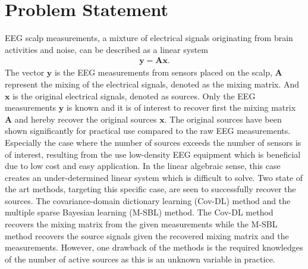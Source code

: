 \chapter{Problem Statement}\label{ch:problemstatement}
EEG scalp measurements, a mixture of electrical signals originating from brain activities and noise, can be described as a linear system
\begin{align*}
\mathbf{y} = \mathbf{Ax}.
\end{align*}
The vector $\mathbf{y}$ is the EEG measurements from sensors placed on the scalp, $\mathbf{A}$ represent the mixing of the electrical signals, denoted as the mixing matrix. And $\mathbf{x}$ is the original electrical signals, denoted as sources. 
Only the EEG measurements $\mathbf{y}$ is known and it is of interest to recover first the mixing matrix $\mathbf{A}$ and hereby recover the original sources $\mathbf{x}$. The original sources have been shown significantly for practical use compared to the raw EEG measurements. 
Especially the case where the number of sources exceeds the number of sensors is of interest, resulting from the use low-density EEG equipment which is beneficial due to low cost and easy application. 
In the linear algebraic sense, this case creates an under-determined linear system which is difficult to solve.
Two state of the art methods, targeting this specific case, are seen to successfully recover the sources. The covariance-domain dictionary learning (Cov-DL) method and the multiple sparse Bayesian learning (M-SBL) method. 
The Cov-DL method recovers the mixing matrix from the given measurements while the M-SBL method recovers the source signals given the recovered mixing matrix and the measurements. 
However, one drawback of the methods is the required knowledges of the number of active sources as this is an unknown variable in practice. 

